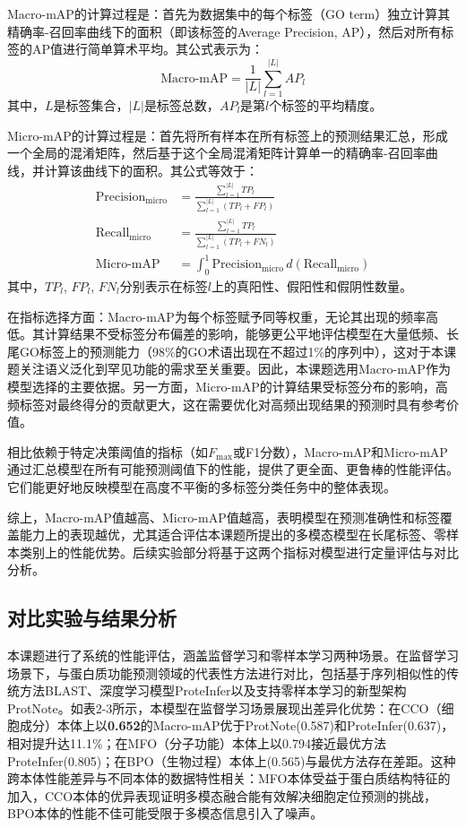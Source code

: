 Macro-mAP的计算过程是：首先为数据集中的每个标签（GO term）独立计算其精确率-召回率曲线下的面积（即该标签的Average Precision, AP），然后对所有标签的AP值进行简单算术平均。其公式表示为：
\begin{equation}
\text{Macro-mAP} = \frac{1}{|L|} \sum_{l=1}^{|L|} AP_l
\end{equation}
其中，$L$是标签集合，$|L|$是标签总数，$AP_l$是第$l$个标签的平均精度。

Micro-mAP的计算过程是：首先将所有样本在所有标签上的预测结果汇总，形成一个全局的混淆矩阵，然后基于这个全局混淆矩阵计算单一的精确率-召回率曲线，并计算该曲线下的面积。其公式等效于：
\begin{align}
\text{Precision}_{\text{micro}} &= \frac{\sum_{l=1}^{|L|} TP_l}{\sum_{l=1}^{|L|} (TP_l + FP_l)} \\
\text{Recall}_{\text{micro}} &= \frac{\sum_{l=1}^{|L|} TP_l}{\sum_{l=1}^{|L|} (TP_l + FN_l)} \\
\text{Micro-mAP} &= \int_{0}^{1} \text{Precision}_{\text{micro}} \, d(\text{Recall}_{\text{micro}})
\end{align}
其中，$TP_l$, $FP_l$, $FN_l$分别表示在标签$l$上的真阳性、假阳性和假阴性数量。

在指标选择方面：Macro-mAP为每个标签赋予同等权重，无论其出现的频率高低。其计算结果不受标签分布偏差的影响，能够更公平地评估模型在大量低频、长尾GO标签上的预测能力（98\%的GO术语出现在不超过1\%的序列中），这对于本课题关注语义泛化到罕见功能的需求至关重要。因此，本课题选用Macro-mAP作为模型选择的主要依据。另一方面，Micro-mAP的计算结果受标签分布的影响，高频标签对最终得分的贡献更大，这在需要优化对高频出现结果的预测时具有参考价值。

相比依赖于特定决策阈值的指标（如$F_{\text{max}}$或F1分数），Macro-mAP和Micro-mAP通过汇总模型在所有可能预测阈值下的性能，提供了更全面、更鲁棒的性能评估。它们能更好地反映模型在高度不平衡的多标签分类任务中的整体表现。

综上，Macro-mAP值越高、Micro-mAP值越高，表明模型在预测准确性和标签覆盖能力上的表现越优，尤其适合评估本课题所提出的多模态模型在长尾标签、零样本类别上的性能优势。后续实验部分将基于这两个指标对模型进行定量评估与对比分析。

\subsection{对比实验与结果分析}
本课题进行了系统的性能评估，涵盖监督学习和零样本学习两种场景。在监督学习场景下，与蛋白质功能预测领域的代表性方法进行对比，包括基于序列相似性的传统方法BLAST\cite{altschul1990basic}、深度学习模型ProteInfer\cite{sanderson2023proteinfer}以及支持零样本学习的新型架构ProtNote\cite{char2025protnote}。如表2-3所示，本模型在监督学习场景展现出差异化优势：在CCO（细胞成分）本体上以\textbf{0.652}的Macro-mAP优于ProtNote(0.587)和ProteInfer(0.637)，相对提升达11.1\%；在MFO（分子功能）本体上以0.794接近最优方法ProteInfer(0.805)；在BPO（生物过程）本体上(0.565)与最优方法存在差距。这种跨本体性能差异与不同本体的数据特性相关：MFO本体受益于蛋白质结构特征的加入，CCO本体的优异表现证明多模态融合能有效解决细胞定位预测的挑战，BPO本体的性能不佳可能受限于多模态信息引入了噪声。


